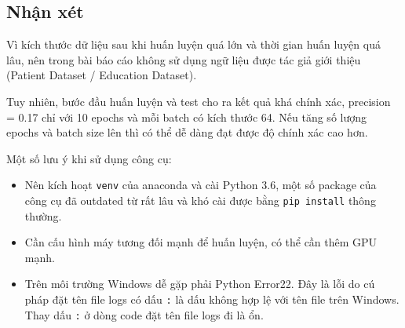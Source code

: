 \documentclass[12pt]{article}
\begin{document}
\subsection{Nhận xét}
Vì kích thước dữ liệu sau khi huấn luyện quá lớn và thời gian huấn luyện quá lâu, nên trong bài báo cáo không sử dụng ngữ liệu được tác giả giới thiệu (Patient Dataset / Education Dataset).

Tuy nhiên, bước đầu huấn luyện và test cho ra kết quả khá chính xác, precision = 0.17 chỉ với 10 epochs và mỗi batch có kích thước 64. Nếu tăng số lượng epochs và batch size lên thì có thể dễ dàng đạt được độ chính xác cao hơn.

Một số lưu ý khi sử dụng công cụ:
\begin{itemize}
    \item Nên kích hoạt \texttt{venv} của anaconda và cài Python 3.6, một số package của công cụ đã outdated từ rất lâu và khó cài được bằng \texttt{pip install} thông thường.\label{notice}
    \item Cần cấu hình máy tương đối mạnh để huấn luyện, có thể cần thêm GPU mạnh.
    \item Trên môi trường Windows dễ gặp phải Python Error22. Đây là lỗi do cú pháp đặt tên file logs có dấu \texttt{:} là dấu không hợp lệ với tên file trên Windows. Thay dấu \texttt{:} ở dòng code đặt tên file logs đi là ổn.
\end{itemize}

\cleardoublepage
{}



\end{document}
